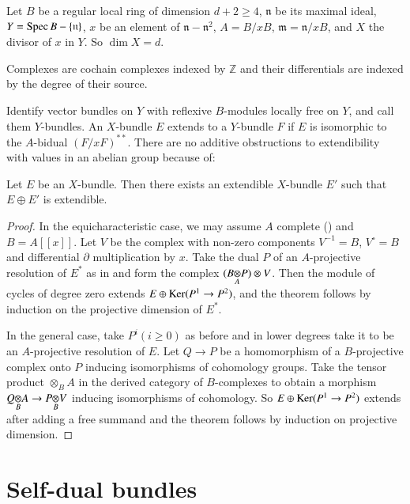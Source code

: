 Let $B$ be a regular local ring of dimension $d+2\geq 4$,
$\mathfrak{n}$ be its maximal ideal, $Y=\operatorname{Spec} B-\{\mathfrak{n}\}$, $x$
be an element of $\mathfrak{n}-\mathfrak{n}^{2}$, $A=B/xB$,
$\mathfrak{m}=\mathfrak{n}/xB$, and $X$ the divisor of $x$ in $Y$. So
$\dim X=d$.

Complexes are cochain complexes indexed by $\mathbb{Z}$ and their
differentials are indexed by the degree of their source.

Identify vector bundles on $Y$ with reflexive $B$-modules locally free
on $Y$, and call them $Y$-bundles. An $X$-bundle $E$ extends to a
$Y$-bundle $F$ if $E$ is isomorphic to the $A$-bidual
$(F/xF)^{**}$. There are no additive obstructions to extendibility
with values in an abelian group because of:

\begin{theorem}\label{chap7-thm1.1}
Let $E$ be an $X$-bundle. Then there exists an extendible $X$-bundle
$E'$ such that $E\oplus E'$ is extendible.
\end{theorem}

\begin{proof}
In the equicharacteristic case, we may assume $A$ complete (\cite[\S\
8]{chap7-key6}) and $B=A[[x]]$. Let $V$ be the complex with non-zero
components $V^{-1}=B$, $V^{\circ}=B$ and differential $\partial$
multiplication by $x$. Take the dual $P$ of an $A$-projective
resolution of $E^{*}$ as in \cite{chap7-key6} and form the complex
$(\foprod{B}{P}{A})\otimes V$. Then the module of cycles of degree
zero extends $E\oplus \operatorname{Ker} (P^{1}\to P^{2})$, and the theorem follows
by induction on the projective dimension of $E^{*}$. 

In the general case, take $P^{i}(i\geq 0)$ as before and in lower
degrees take it to be an $A$-projective resolution of $E$. Let $Q\to
P$ be a homomorphism of a $B$-projective complex onto $P$ inducing
isomorphisms of cohomology groups. Take the tensor product
$\otimes_{B}A$ in the derived category of $B$-complexes to obtain a
morphism $\foprod{Q}{A}{B}\to \foprod{P}{V}{B}$ inducing isomorphisms
of cohomology. So $E\oplus \operatorname{Ker} (P^{1}\to P^{2})$ extends after adding
a free summand and the theorem follows by induction on projective
dimension. 
\end{proof}

\section{Self-dual bundles}\label{chap7-sec2}\pageoriginale

